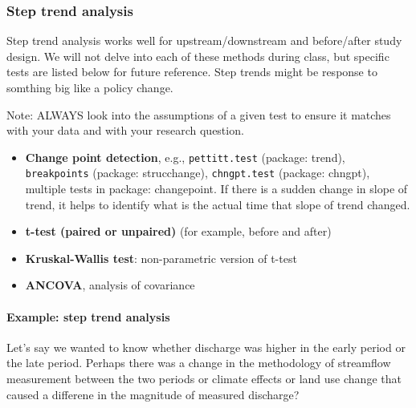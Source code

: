 \documentclass[
]{article}
\newenvironment{Shaded}{\begin{snugshade}}{\end{snugshade}}
\newcommand{\CommentTok}[1]{\textcolor[rgb]{0.56,0.35,0.01}{\textit{#1}}}
\newcommand{\DecValTok}[1]{\textcolor[rgb]{0.00,0.00,0.81}{#1}}
\newcommand{\KeywordTok}[1]{\textcolor[rgb]{0.13,0.29,0.53}{\textbf{#1}}}
\newcommand{\NormalTok}[1]{#1}
\newcommand{\OperatorTok}[1]{\textcolor[rgb]{0.81,0.36,0.00}{\textbf{#1}}}
\newcommand{\StringTok}[1]{\textcolor[rgb]{0.31,0.60,0.02}{#1}}
\providecommand{\tightlist}{%
  \setlength{\itemsep}{0pt}\setlength{\parskip}{0pt}}
\begin{document}
\hypertarget{step-trend-analysis}{%
\subsubsection{Step trend analysis}\label{step-trend-analysis}}

Step trend analysis works well for upstream/downstream and before/after
study design. We will not delve into each of these methods during class,
but specific tests are listed below for future reference. Step trends
might be response to somthing big like a policy change.

Note: ALWAYS look into the assumptions of a given test to ensure it
matches with your data and with your research question.

\begin{itemize}
\tightlist
\item
  \textbf{Change point detection}, e.g., \texttt{pettitt.test} (package:
  trend), \texttt{breakpoints} (package: strucchange),
  \texttt{chngpt.test} (package: chngpt), multiple tests in package:
  changepoint. If there is a sudden change in slope of trend, it helps
  to identify what is the actual time that slope of trend changed.
\item
  \textbf{t-test (paired or unpaired)} (for example, before and after)
\item
  \textbf{Kruskal-Wallis test}: non-parametric version of t-test
\item
  \textbf{ANCOVA}, analysis of covariance
\end{itemize}

\hypertarget{example-step-trend-analysis}{%
\paragraph{Example: step trend
analysis}\label{example-step-trend-analysis}}

Let's say we wanted to know whether discharge was higher in the early
period or the late period. Perhaps there was a change in the methodology
of streamflow measurement between the two periods or climate effects or
land use change that caused a differene in the magnitude of measured
discharge?

\begin{Shaded}
\end{Shaded}
\end{document}
